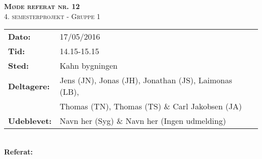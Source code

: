 
\newcommand{\HRule}{\rule{\linewidth}{0.1mm}}


	\begin{center}
		{\huge \bfseries \textsc{Møde referat nr. 12}}\\
		\textsc{\large 4. semesterprojekt - Gruppe 1}\\[0.3cm]
	\end{center}
	\begin{tabular}{ll}
	\large \textbf{Dato:} & 17/05/2016  \\ %
	\large \textbf{Tid:}  & 14.15-15.15 \\ %
	\large \textbf{Sted:} & Kahn bygningen	\\ %
	\large \textbf{Deltagere:} & Jens (JN), Jonas (JH), Jonathan (JS), Laimonas (LB), \\
	\large \textbf & Thomas (TN),  Thomas (TS) \& Carl Jakobsen (JA)\\
	\large \textbf{Udeblevet:} & Navn her (Syg) \& Navn her (Ingen udmelding)	\\
	\end{tabular}\\
	\phantom{\,}\hspace{0.1em} \large \textbf{Referat:}
